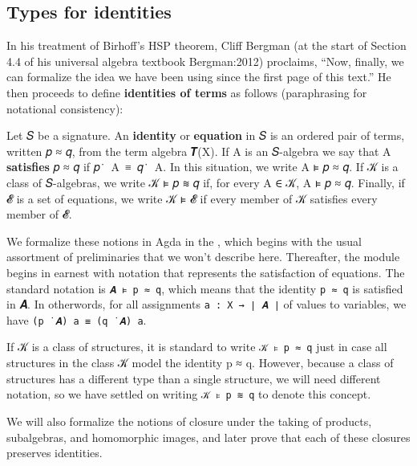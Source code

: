 \documentclass[a4paper,UKenglish,cleveref, autoref, thm-restate]{lipics-v2019}
\begin{document}
\subsection{Types for identities}\label{types-for-identities}
In his treatment of Birhoff's HSP theorem, Cliff Bergman (at the start of Section 4.4 of his universal algebra textbook Bergman:2012) proclaims, ``Now, finally, we can formalize the idea we have been using since the first page of this text.'' He then proceeds to define \textbf{identities of terms} as follows (paraphrasing for notational consistency):

Let 𝑆 be a signature. An \textbf{identity} or \textbf{equation} in 𝑆 is an ordered pair of terms, written 𝑝 ≈ 𝑞, from the term algebra 𝑻(X). If A is an 𝑆-algebra we say that A \textbf{satisfies} 𝑝 ≈ 𝑞 if 𝑝~̇~A~≡~𝑞~̇~A. In this situation, we write A ⊧ 𝑝 ≈ 𝑞.
If 𝒦 is a class of 𝑆-algebras, we write 𝒦 ⊧ 𝑝 ≋ 𝑞 if, for every A ∈ 𝒦, A ⊧ 𝑝 ≈ 𝑞. Finally, if 𝓔 is a set of equations, we write 𝒦 ⊧ 𝓔 if every member of 𝒦 satisfies every member of 𝓔.

We formalize these notions in Agda in the \closuremodule, which begins with the usual assortment of preliminaries that we won't describe here.  Thereafter, the module begins in earnest with
notation that represents the satisfaction of equations. The standard notation is \texttt{𝑨\ ⊧\ p\ ≈\ q}, which means that the identity \texttt{p\ ≈\ q} is satisfied in 𝑨. In otherwords, for all assignments \texttt{a\ :\ X\ →\ ∣\ 𝑨\ ∣} of values to variables, we have \texttt{(p\ ̇\ 𝑨)\ a\ ≡\ (q\ ̇\ 𝑨)\ a}.

If 𝒦 is a class of structures, it is standard to write \texttt{𝒦\ ⊧\ p\ ≈\ q} just in case all structures in the class 𝒦 model the identity p ≈ q. However, because a class of structures has a different type than a single structure, we will need different notation, so we have settled on writing \texttt{𝒦\ ⊧\ p\ ≋\ q} to denote this concept.

We will also formalize the notions of closure under the taking of products, subalgebras, and homomorphic images, and later prove that each of these closures preserves identities.
\begin{code}\end{code}
\end{document}
